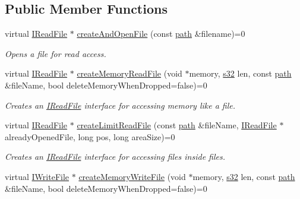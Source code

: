\subsection*{Public Member Functions}
\begin{DoxyCompactItemize}
\item 
virtual \hyperlink{classirr_1_1io_1_1IReadFile}{I\+Read\+File} $\ast$ \hyperlink{classirr_1_1io_1_1IFileSystem_a3678bb77e12cc6ee2b3947f4c79f6c90}{create\+And\+Open\+File} (const \hyperlink{namespaceirr_1_1io_a6468281622ce3a1c46b72e19f32dded5}{path} \&filename)=0
\begin{DoxyCompactList}\small\item\em Opens a file for read access. \end{DoxyCompactList}\item 
virtual \hyperlink{classirr_1_1io_1_1IReadFile}{I\+Read\+File} $\ast$ \hyperlink{classirr_1_1io_1_1IFileSystem_ac60a4b7912a7f2364426dc1aaf9bccae}{create\+Memory\+Read\+File} (void $\ast$memory, \hyperlink{namespaceirr_ac66849b7a6ed16e30ebede579f9b47c6}{s32} len, const \hyperlink{namespaceirr_1_1io_a6468281622ce3a1c46b72e19f32dded5}{path} \&file\+Name, bool delete\+Memory\+When\+Dropped=false)=0
\begin{DoxyCompactList}\small\item\em Creates an \hyperlink{classirr_1_1io_1_1IReadFile}{I\+Read\+File} interface for accessing memory like a file. \end{DoxyCompactList}\item 
virtual \hyperlink{classirr_1_1io_1_1IReadFile}{I\+Read\+File} $\ast$ \hyperlink{classirr_1_1io_1_1IFileSystem_a8b110f1ed6f52098753b7a558c020dbc}{create\+Limit\+Read\+File} (const \hyperlink{namespaceirr_1_1io_a6468281622ce3a1c46b72e19f32dded5}{path} \&file\+Name, \hyperlink{classirr_1_1io_1_1IReadFile}{I\+Read\+File} $\ast$already\+Opened\+File, long pos, long area\+Size)=0
\begin{DoxyCompactList}\small\item\em Creates an \hyperlink{classirr_1_1io_1_1IReadFile}{I\+Read\+File} interface for accessing files inside files. \end{DoxyCompactList}\item 
virtual \hyperlink{classirr_1_1io_1_1IWriteFile}{I\+Write\+File} $\ast$ \hyperlink{classirr_1_1io_1_1IFileSystem_a568dd1e737fe3d3222b2e4ca2b6ebad3}{create\+Memory\+Write\+File} (void $\ast$memory, \hyperlink{namespaceirr_ac66849b7a6ed16e30ebede579f9b47c6}{s32} len, const \hyperlink{namespaceirr_1_1io_a6468281622ce3a1c46b72e19f32dded5}{path} \&file\+Name, bool delete\+Memory\+When\+Dropped=false)=0

\end{DoxyCompactItemize}
